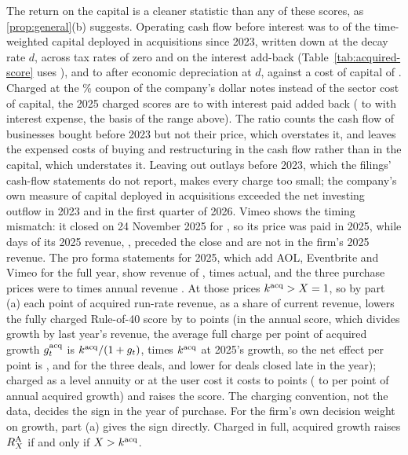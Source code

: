 The return on the capital is a cleaner statistic than any of these scores, as \autoref{prop:general}(b) suggests. Operating cash flow before interest was \acqRetLo{} to \acqRetHi{} of the time-weighted capital deployed in acquisitions since 2023, written down at the decay rate $d$, across tax rates of zero and \acqTauIres{} on the interest add-back (Table~\ref{tab:acquired-score} uses \acqTauIres), and \acqRetNetLo{} to \acqRetNetHi{} after economic depreciation at $d$, against a cost of capital of \acqRw. Charged at the \acqCouponMarg\% coupon of the company's dollar notes instead of the sector cost of capital, the 2025 charged scores are \acqChCouponLo{} to \acqChCouponHi{} with interest paid added back (\acqChCouponExpLo{} to \acqChCouponExpHi{} with interest expense, the basis of the range above). The ratio counts the cash flow of businesses bought before 2023 but not their price, which overstates it, and leaves the expensed costs of buying and restructuring in the cash flow rather than in the capital, which understates it. Leaving out outlays before 2023, which the filings' cash-flow statements do not report, makes every charge too small; the company's own measure of capital deployed in acquisitions exceeded the net investing outflow in 2023 and in the first quarter of 2026. Vimeo shows the timing mismatch: it closed on 24 November 2025 for \acqPxVim, so its price was paid in 2025, while \acqVimDays{} days of its 2025 revenue, \acqVimPre, preceded the close and are not in the firm's 2025 revenue. The pro forma statements for 2025, which add AOL, Eventbrite and Vimeo for the full year, show revenue of \acqPfRev, \acqPfRatio{} times actual, and the three purchase prices were \acqKEb{} to \acqKVim{} times annual revenue \citep{bendingspoons2026prospectus}. At those prices $k^{\rm acq}>X=1$, so by part (a) each point of acquired run-rate revenue, as a share of current revenue, lowers the fully charged Rule-of-40 score by \acqFullPtsLo{} to \acqFullPtsHi{} points (in the annual score, which divides growth by last year's revenue, the average full charge per point of acquired growth $g^{\rm acq}_t$ is $k^{\rm acq}/(1+g_t)$, \acqAnnFactor{} times $k^{\rm acq}$ at 2025's growth, so the net effect per point is \acqFullAnnEb, \acqFullAnnAol{} and \acqFullAnnVim{} for the three deals, and lower for deals closed late in the year); charged as a level annuity or at the user cost it costs \acqAnnPtsLo{} to \acqUcPtsHi{} points (\acqAnnPtsAnnLo{} to \acqUcPtsAnnHi{} per point of annual acquired growth) and raises the score. The charging convention, not the data, decides the sign in the year of purchase. For the firm's own decision weight on growth, part (a) gives the sign directly. Charged in full, acquired growth raises $R^{\rm A}_X$ if and only if $X>k^{\rm acq}$. 
